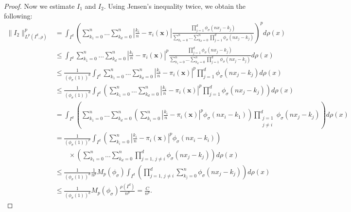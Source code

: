 \documentclass[12pt, reqno]{amsart}
\numberwithin{equation}{section}
\theoremstyle{definition}
\theoremstyle{remark}
\numberwithin{equation}{section}
\newcommand{\X}{\mathbf{x}}
\newcommand{\LP}{L^p(I^d, \rho)}
\begin{document}
\begin{proof}
Now we estimate $I_1$ and $I_2.$ Using Jensen's inequality twice, we obtain the following:
\begin{align}
\|I_2\|^p_{\LP} 
&= \int_{I^d} \left( \sum_{k_1=0}^n \ldots \sum_{k_d=0}^n \left| \frac{k_i}{n} - \pi_i(\X) \right| \frac{\prod_{j=1}^d \phi_\sigma(nx_j - k_j)} {\sum_{k_1=0}^n \ldots \sum_{k_d=0}^n \prod_{j=1}^d \phi_\sigma(nx_j - k_j)} \right)^p d\rho(x) \nonumber \\
&\leq \int_{I^d} \sum_{k_1=0}^n \ldots \sum_{k_d=0}^n \left| \frac{k_i}{n} - \pi_i(\X) \right|^p \frac{\prod_{j=1}^d \phi_\sigma(nx_j - k_j)} {\sum_{k_1=0}^n \ldots \sum_{k_d=0}^n \prod_{j=1}^d \phi_\sigma(nx_j - k_j)} d\rho(x) \nonumber \\
&\leq \frac{1}{(\phi_\sigma(1))^d} \int_{I^d} \sum_{k_1=0}^n \ldots \sum_{k_d=0}^n \left| \frac{k_i}{n} - \pi_i(\X) \right|^p \prod_{j=1}^d \phi_\sigma(nx_j - k_j) d\rho(x) \nonumber \\
&\leq \frac{1}{(\phi_\sigma(1))^d} \int_{I^d} \left( \sum_{k_1=0}^n \ldots \sum_{k_d=0}^n \left| \frac{k_i}{n} - \pi_i(\X) \right|^p \prod_{j=1}^d \phi_\sigma(nx_j - k_j) \right) d\rho(x) \nonumber \\
&=  \int_{I^d} \left( \sum_{k_1=0}^n \ldots \sum_{k_d=0}^n \left( \sum_{k_i=0}^n \left| \frac{k_i}{n} - \pi_i(\X) \right|^p \phi_\sigma(nx_i - k_1) \right) \prod_{\substack{j=1 \\ j\neq i}}^d \phi_\sigma(nx_j - k_j)\right) d\rho(x) \nonumber \\
&= \frac{1}{(\phi_\sigma(1))^p} \int_{I^d} \left( \sum_{k_i=0}^n \left| \frac{k_i}{n} - \pi_i(\X) \right|^p \phi_\sigma(nx_i - k_i) \right) \nonumber \\
&\qquad \times \left( \sum_{k_1=0}^n \ldots \sum_{k_d=0}^n \prod_{j=1,\, j \neq i}^d \phi_\sigma(nx_j - k_j) \right) d\rho(x) \nonumber \\
&\leq \frac{1}{(\phi_\sigma(1))^d} \frac{1}{n^p} M_p(\phi_\sigma) \int_{I^d} \left( \prod_{j=1,\, j \neq i}^d \sum_{k_j=0}^n \phi_\sigma(nx_j - k_j) \right) d\rho(x) \nonumber \\
&\leq \frac{1}{(\phi_\sigma(1))^d} M_p(\phi_\sigma) \frac{\rho(I^d)}{n^p} = \frac{C}{n^p}. \label{mI2esti}
\end{align}


\end{proof}
\end{document}
